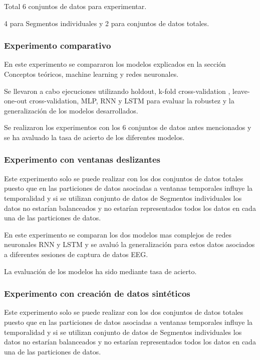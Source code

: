 Total 6 conjuntos de datos para experimentar. 

4 para Segmentos individuales y 2 para conjuntos de datos totales.


\subsubsection{Experimento comparativo}

En este experimento se compararon los modelos explicados en la sección Conceptos teóricos, machine learning y redes neuronales.

Se llevaron a cabo ejecuciones utilizando holdout, k-fold cross-validation , leave-one-out cross-validation, MLP, RNN y LSTM para evaluar la robustez y la generalización de los modelos desarrollados.

Se realizaron los experimentos con los 6 conjuntos de datos antes mencionados y se ha avaluado la tasa de acierto de los diferentes modelos.


\subsubsection{Experimento con ventanas deslizantes}

Este experimento solo se puede realizar con los dos conjuntos de datos totales puesto que en las particiones de datos asociadas a ventanas temporales influye la temporalidad y si se utilizan conjunto de datos de Segmentos individuales los datos no estarían balanceados y no estarían representados todos los datos en cada una de las particiones de datos.


En este experimento se comparan los dos modelos mas complejos de redes neuronales RNN y LSTM y se avaluó la generalización para estos datos asociados a diferentes sesiones de captura de datos EEG.

La evaluación de los modelos ha sido mediante tasa de acierto.


\subsubsection{Experimento con creación de datos sintéticos}

Este experimento solo se puede realizar con los dos conjuntos de datos totales puesto que en las particiones de datos asociadas a ventanas temporales influye la temporalidad y si se utilizan conjunto de datos de Segmentos individuales los datos no estarían balanceados y no estarían representados todos los datos en cada una de las particiones de datos.

